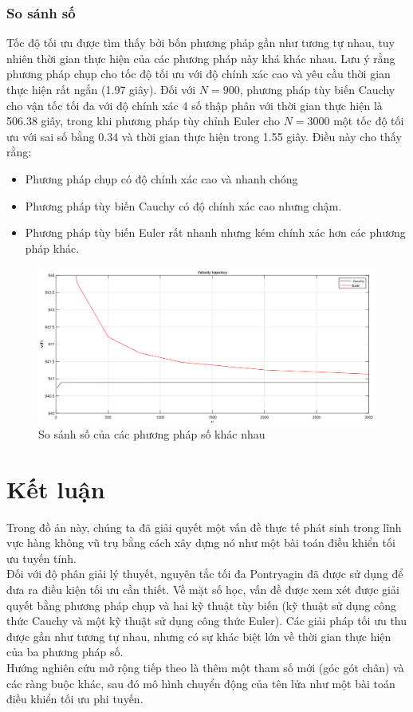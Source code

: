 \documentclass[12pt,a4paper]{report}
\begin{document}
	\subsection{So sánh số}
	Tốc độ tối ưu được tìm thấy bởi bốn phương pháp gần như tương tự nhau, tuy nhiên thời gian thực hiện của các phương pháp này khá khác nhau. Lưu ý rằng phương pháp chụp cho tốc độ tối ưu với độ chính xác cao và yêu cầu thời gian thực hiện rất ngắn (1.97 giây). Đối với $N = 900$, phương pháp tùy biến Cauchy cho vận tốc tối đa với độ chính xác 4 số thập phân với thời gian thực hiện là 506.38 giây, trong khi phương pháp tùy chỉnh Euler cho $N = 3000$ một tốc độ tối ưu với sai số bằng 0.34 và thời gian thực hiện trong 1.55 giây. Điều này cho thấy rằng: 
	\begin{itemize}
		\item Phương pháp chụp có độ chính xác cao và nhanh chóng
		\item Phương pháp tùy biến Cauchy có độ chính xác cao nhưng chậm.
		\item Phương pháp tùy biến Euler rất nhanh nhưng kém chính xác hơn các phương pháp khác.
	\end{itemize}
\begin{figure}[h]
	\centering
	\includegraphics[scale=.55]{./image/hinh5}
	\caption{So sánh số của các phương pháp số khác nhau}
\end{figure}
	\chapter{Kết luận}
	Trong đồ án này, chúng ta đã giải quyết một vấn đề thực tế phát sinh trong lĩnh vực hàng không vũ trụ bằng cách xây dựng nó như một bài toán điều khiển tối ưu tuyến tính. \\ Đối với độ phân giải lý thuyết, nguyên tắc tối đa Pontryagin đã được sử dụng để đưa ra điều kiện tối ưu cần thiết. Về mặt số học, vấn đề được xem xét được giải quyết bằng phương pháp chụp và hai kỹ thuật tùy biến (kỹ thuật sử dụng công thức Cauchy và một kỹ thuật sử dụng công thức Euler). Các giải pháp tối ưu thu được gần như tương tự nhau, nhưng có sự khác biệt lớn về thời gian thực hiện của ba phương pháp số. \\ Hướng nghiên cứu mở rộng tiếp theo là thêm một tham số mới (góc gót chân) và các ràng buộc khác, sau đó mô hình chuyển động của tên lửa như một bài toán điều khiển tối ưu phi tuyến.
	
\end{document}
